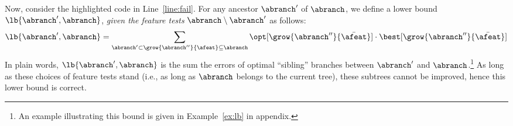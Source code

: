 \documentclass{article}
\begin{document}
Now, consider the highlighted code in Line~\ref{line:fail}.
For any ancestor $\abranch'$ of $\abranch$, we define a lower bound $\lb{\abranch',\abranch}$, \emph{given the feature tests} $\abranch \setminus \abranch'$ as follows:
$$
\lb{\abranch',\abranch} = \sum\limits_{\abranch' \subset \grow{\abranch''}{\afeat} \subseteq \abranch}\opt[\grow{\abranch''}{\bar{\afeat}}] \cdot \best[\grow{\abranch''}{\bar{\afeat}}]
$$
In plain words, $\lb{\abranch',\abranch}$ is the sum the errors of optimal ``sibling'' branches between $\abranch'$ and $\abranch$.\footnote{An example illustrating this bound is given in Example~\ref{ex:lb} in  appendix.} %
As long as these choices of feature tests stand (i.e., as long as $\abranch$ belongs to the current tree), these subtrees cannot be improved, hence this lower bound is correct.


%
\end{document}

